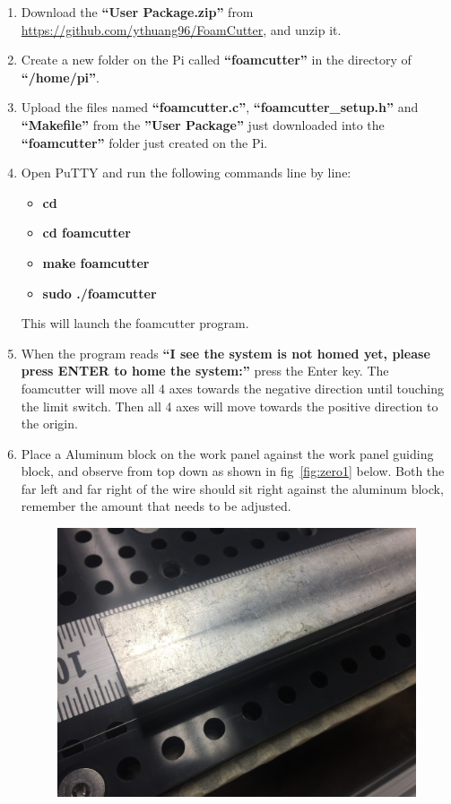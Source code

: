 \documentclass[titlepage,12pt,letter]{report}
\numberwithin{equation}{chapter}
\begin{document}
\begin{enumerate}[noitemsep,topsep=0pt]
\item Download the \textbf{``User Package.zip''} from \href{https://github.com/ythuang96/FoamCutter}{https://github.com/ythuang96/FoamCutter}, and unzip it.
\item Create a new folder on the Pi called \textbf{``foamcutter''} in the directory of \textbf{``/home/pi''}. 
\item Upload the files named \textbf{``foamcutter.c''}, \textbf{``foamcutter\_setup.h''} and \textbf{``Makefile''} from the \textbf{''User Package''} just downloaded into the \textbf{``foamcutter''} folder just created on the Pi.
\item Open PuTTY and run the following commands line by line:
\begin{itemize}[noitemsep,topsep=0pt]
	\item \textbf{cd}
	\item \textbf{cd foamcutter}
	\item \textbf{make foamcutter}
	\item \textbf{sudo ./foamcutter}
\end{itemize}
This will launch the foamcutter program.
\item When the program reads \textbf{``I see the system is not homed yet, please press ENTER to home the system:''} press the Enter key. The foamcutter will move all 4 axes towards the negative direction until touching the limit switch. Then all 4 axes will move towards the positive direction to the origin.
\item Place a Aluminum block on the work panel against the work panel guiding block, and observe from top down as shown in fig~\ref{fig:zero1} below. Both the far left and far right of the wire should sit right against the aluminum block, remember the amount that needs to be adjusted. 
\begin{figure} [H]
\includegraphics[width = 0.8\linewidth]{./Figures/zero_wire_1.jpg}

\end{figure}
\end{enumerate}
\end{document}
